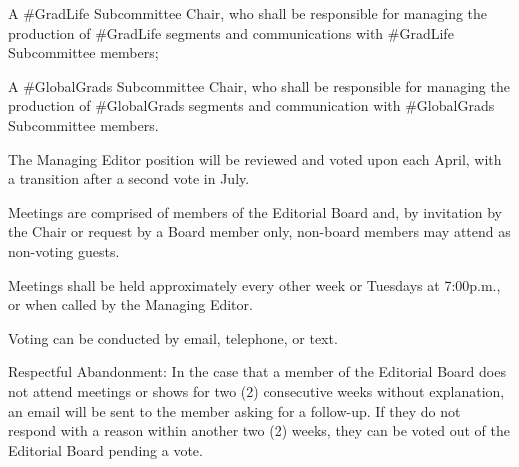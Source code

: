 \begin{longenum}[ label*=\thesubsection.\arabic*., align=left]
\begin{longenum}[label*=\arabic*., align=left]
	\item A \#GradLife Subcommittee Chair, who shall be responsible for managing the production of \#GradLife segments and communications with \#GradLife Subcommittee members;
	\item A \#GlobalGrads Subcommittee Chair, who shall be responsible for managing the production of \#GlobalGrads segments and communication with \#GlobalGrads Subcommittee members. 
	\end{longenum}
\item The Managing Editor position will be reviewed and voted upon each April, with a transition after a second vote in July.
\item Meetings are comprised of members of the Editorial Board and, by invitation by the Chair or request by a Board member only, non-board members may attend as non-voting guests.
	\begin{longenum}[label*=\arabic*., align=left]	
	\item Meetings shall be held approximately every other week or Tuesdays at 7:00p.m., or when called by the Managing Editor.
	\end{longenum}
\item Voting can be conducted by email, telephone, or text.
\item Respectful Abandonment: In the case that a member of the Editorial Board does not attend meetings or shows for two (2) consecutive weeks without explanation, an email will be sent to the member asking for a follow-up. If they do not respond with a reason within another two (2) weeks, they can be voted out of the Editorial Board pending a vote.
\end{longenum}

